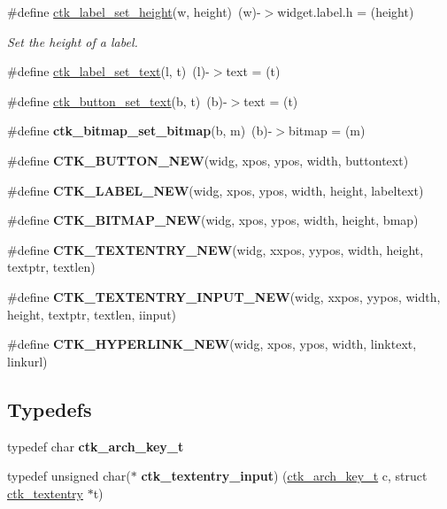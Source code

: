 \begin{DoxyCompactItemize}
\item 
\#define \hyperlink{group__ctkappfunc_gad7b543653a1b4f096aa06726a1157348}{ctk\+\_\+label\+\_\+set\+\_\+height}(w,  height)~(w)-\/$>$widget.\+label.\+h = (height)
\begin{DoxyCompactList}\small\item\em Set the height of a label. \end{DoxyCompactList}\item 
\#define \hyperlink{group__ctkappfunc_ga225ec59b9d1209ca7785269c49c98a89}{ctk\+\_\+label\+\_\+set\+\_\+text}(l,  t)~(l)-\/$>$text = (t)
\item 
\#define \hyperlink{group__ctkappfunc_ga0edffc30213aeb1f0e9a5f494918d99e}{ctk\+\_\+button\+\_\+set\+\_\+text}(b,  t)~(b)-\/$>$text = (t)
\item 
\hypertarget{group__ctkappfunc_gafe5faf18de2a6560afbb21032814f0c2}{}\#define {\bfseries ctk\+\_\+bitmap\+\_\+set\+\_\+bitmap}(b,  m)~(b)-\/$>$bitmap = (m)\label{group__ctkappfunc_gafe5faf18de2a6560afbb21032814f0c2}

\item 
\#define {\bfseries C\+T\+K\+\_\+\+B\+U\+T\+T\+O\+N\+\_\+\+N\+E\+W}(widg,  xpos,  ypos,  width,  buttontext)
\item 
\#define {\bfseries C\+T\+K\+\_\+\+L\+A\+B\+E\+L\+\_\+\+N\+E\+W}(widg,  xpos,  ypos,  width,  height,  labeltext)
\item 
\#define {\bfseries C\+T\+K\+\_\+\+B\+I\+T\+M\+A\+P\+\_\+\+N\+E\+W}(widg,  xpos,  ypos,  width,  height,  bmap)
\item 
\#define {\bfseries C\+T\+K\+\_\+\+T\+E\+X\+T\+E\+N\+T\+R\+Y\+\_\+\+N\+E\+W}(widg,  xxpos,  yypos,  width,  height,  textptr,  textlen)
\item 
\#define {\bfseries C\+T\+K\+\_\+\+T\+E\+X\+T\+E\+N\+T\+R\+Y\+\_\+\+I\+N\+P\+U\+T\+\_\+\+N\+E\+W}(widg,  xxpos,  yypos,  width,  height,  textptr,  textlen,  iinput)
\item 
\#define {\bfseries C\+T\+K\+\_\+\+H\+Y\+P\+E\+R\+L\+I\+N\+K\+\_\+\+N\+E\+W}(widg,  xpos,  ypos,  width,  linktext,  linkurl)
\end{DoxyCompactItemize}
\subsection*{Typedefs}
\begin{DoxyCompactItemize}
\item 
\hypertarget{group__ctkappfunc_gaa6eb41324497b3d828d208c0efa6fa90}{}typedef char {\bfseries ctk\+\_\+arch\+\_\+key\+\_\+t}\label{group__ctkappfunc_gaa6eb41324497b3d828d208c0efa6fa90}

\item 
\hypertarget{group__ctkappfunc_gafdc7151ce56569ab4c536432b529fb7f}{}typedef unsigned char($\ast$ {\bfseries ctk\+\_\+textentry\+\_\+input}) (\hyperlink{group__ctkdraw_gaa6eb41324497b3d828d208c0efa6fa90}{ctk\+\_\+arch\+\_\+key\+\_\+t} c, struct \hyperlink{structctk__textentry}{ctk\+\_\+textentry} $\ast$t)\label{group__ctkappfunc_gafdc7151ce56569ab4c536432b529fb7f}

\end{DoxyCompactItemize}
